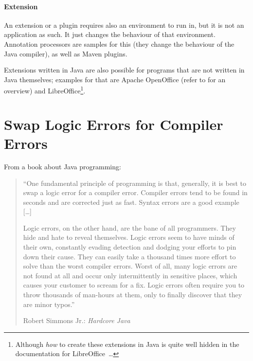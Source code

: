 \documentclass[11pt,a4paper, titlepage, parskip=half, headsepline, footsepline, cleardoublepage=current, headheight=1cm]{scrbook}
\begin{document}

\paragraph{Extension}\label{sec:Extension}
An extension or a plugin requires also an environment to run in, but it is not an application as such. It just changes the behaviour of that environment. Annotation processors are samples for this (they change the behaviour of the Java compiler), as well as Maven\autocite{APACHE_MAVEN} plugins.

Extensions written in Java are also possible for programs that are not written in Java themselves; examples for that are Apache OpenOffice\autocite{APACHE_OPENOFFICE} (refer to \autocite{APACHE_OPENOFFICE:ExtensionsInJava} for an overview) and LibreOffice\autocite{LIBREOFFICE}\footnote{Although \textit{how} to create these extensions in Java is quite well hidden in the documentation for LibreOffice~…}.


\section{Swap Logic Errors for Compiler Errors}\label{sec:SwapToCompilerErrors}
From a book about Java programming:
\begin{quotation}
“One fundamental principle of programming is that, generally, it is best to swap a logic error for a compiler error. Compiler errors tend to be found in seconds and are corrected just as fast. Syntax errors are a good example […]

Logic errors, on the other hand, are the bane of all programmers. They hide and hate to reveal themselves. Logic errors seem to have minds of their own, constantly evading detection and dodging your efforts to pin down their cause. They can easily take a thousand times more effort to solve than the worst compiler errors. Worst of all, many logic errors are not found at all and occur only intermittently in sensitive places, which causes your customer to scream for a fix. Logic errors often require you to throw thousands of man-hours at them, only to finally discover that they are minor typos.”

Robert Simmons Jr.: \textit{Hardcore Java}\autocite{Simmons:HARDCORE_JAVA}
\end{quotation}
\end{document}
